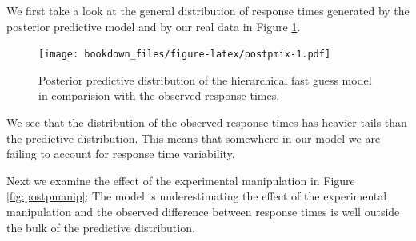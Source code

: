 \documentclass[12pt,]{krantz}
\newenvironment{Shaded}{\begin{snugshade}}{\end{snugshade}}
\newcommand{\KeywordTok}[1]{\textcolor[rgb]{0.13,0.29,0.53}{\textbf{#1}}}
\newcommand{\DataTypeTok}[1]{\textcolor[rgb]{0.13,0.29,0.53}{#1}}
\newcommand{\DecValTok}[1]{\textcolor[rgb]{0.00,0.00,0.81}{#1}}
\newcommand{\FloatTok}[1]{\textcolor[rgb]{0.00,0.00,0.81}{#1}}
\newcommand{\StringTok}[1]{\textcolor[rgb]{0.31,0.60,0.02}{#1}}
\newcommand{\ControlFlowTok}[1]{\textcolor[rgb]{0.13,0.29,0.53}{\textbf{#1}}}
\newcommand{\OperatorTok}[1]{\textcolor[rgb]{0.81,0.36,0.00}{\textbf{#1}}}
\newcommand{\NormalTok}[1]{#1}
\theoremstyle{definition}
\theoremstyle{definition}
\theoremstyle{definition}
\theoremstyle{remark}
\begin{document}
We first take a look at the general distribution of response times
generated by the posterior predictive model and by our real data in
Figure \ref{fig:postpmix}.




\begin{Shaded}
\end{Shaded}

\begin{figure}
\centering
\texttt{[image: bookdown\_files/figure-latex/postpmix-1.pdf]}
\caption{\label{fig:postpmix}Posterior predictive distribution of the hierarchical
fast guess model in comparision with the observed response times.}
\end{figure}

We see that the distribution of the observed response times has heavier
tails than the predictive distribution. This means that somewhere in our
model we are failing to account for response time variability.

Next we examine the effect of the experimental manipulation in Figure
\ref{fig:postpmanip}: The model is underestimating the effect of the
experimental manipulation and the observed difference between response
times is well outside the bulk of the predictive distribution.




\begin{Shaded}
\end{Shaded}
\end{document}
